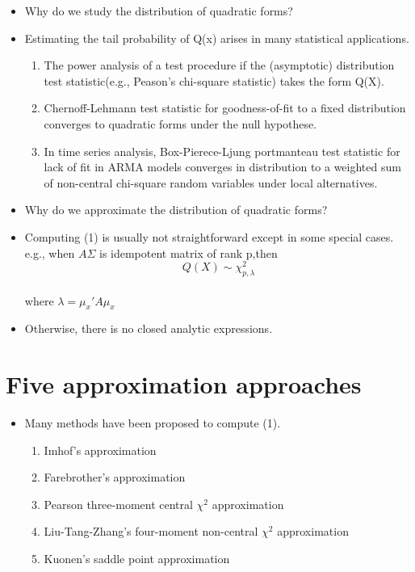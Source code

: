 \documentclass[10pt]{beamer}
\begin{document}
\begin{frame}
	\begin{itemize}
			\item Why do we study the distribution of quadratic forms?
			\item Estimating the tail probability of Q(x) arises in many statistical applications.	
		\begin{enumerate}
				\item The power analysis of a test procedure if the (asymptotic) distribution test statistic(e.g., Peason's chi-square statistic) takes the form Q(X).
				\item Chernoff-Lehmann test statistic for goodness-of-fit to a fixed distribution converges to quadratic forms under the null hypothese.
				\item In time series analysis, Box-Pierece-Ljung portmanteau test statistic for lack of fit in ARMA models converges in distribution to a weighted sum of non-central chi-square random variables under local alternatives.
			\end{enumerate}
	\end{itemize}	
\end{frame}

\begin{frame}
	\begin{itemize}
			\item Why do we approximate the distribution of quadratic forms?
			\item Computing (1) is usually not straightforward except in some special cases. 
			e.g., when $A\Sigma$ is idempotent matrix of rank p,then \[  Q(X)\sim \chi_{p,
				\lambda}^2\]
			\\
			where $\lambda={{\mu_x}'}A\mu_x$
			\item Otherwise, there is no closed analytic expressions.
	\end{itemize}
\end{frame}

\section{Five approximation approaches}
\begin{frame}
	\begin{itemize}
		\item Many methods have been proposed to compute (1).
		\begin{enumerate}
			\item Imhof's approximation 
			\item Farebrother's approximation 
			\item Pearson three-moment central $\chi^2$ approximation 
			\item Liu-Tang-Zhang's four-moment non-central $\chi^2$ approximation
			\item Kuonen's saddle point approximation 
		\end{enumerate}
	\end{itemize}
\end{frame}
\end{document}
